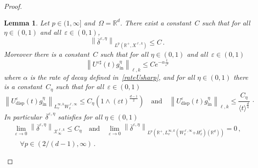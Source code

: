 \documentclass[11pt]{article}
\newtheorem{lemm}[theo]{Lemma}
\theoremstyle{definition}
\numberwithin{equation}{section}
\numberwithin{figure}{section}
\numberwithin{table}{section}
\newcommand*\R {\mathbb{R}}
\newcommand*\eps{{\varepsilon}}
\newcommand*\e{{\varepsilon}}
\DeclareMathOperator{\inn}{in}
\DeclareMathOperator{\disp}{disp}
\let\oldforall\forall
\renewcommand*{\forall}{\mathrel{\oldforall}}
\begin{document}
\begin{proof}
\begin{lemm}\label{resultstildegeps}
Let $p \in (1, \infty]$ and~$\Omega = \R^d$. There exist a constant~$C$ such that for all $\eta \in (0,1)$ and all~$\eps \in (0,1)$,
\begin{equation}\label{estimateLpXtildeg}
\left\|\overline\delta^{\eps,\eta} \right\|_{L^p(\R^+,{X}^{\ell,k})}
\leq C\,.
\end{equation}
Moreover there is a constant~$C$ such that for all $\eta \in (0,1)$ and all~$\eps \in (0,1)$
\begin{equation}\label{estimatedelta2}
\left\| U^{\eps \sharp}(t)g^\eta_{\inn}
\right\|_{\ell,k} \leq C e^{-\alpha \frac{t}{\eps^2}}
\end{equation}
where $\alpha$ is the rate of decay defined in~\eqref{rateUsharp}, and for all $\eta \in (0,1)$ there is a constant~$C_\eta$ such that for all~$\eps \in (0,1)$
\begin{equation}\label{estimatedelta1}
\left\|U^\eps_{\disp}(t) g^\eta_{\inn} \right\|_{L^{\infty,k}_v W^{\ell,\infty}_x} \leq C_\eta\left(1 \wedge \left(\eps t \right)^{\frac{d-1}{2}} \right)
\quad \text{and} \quad {\left\|U^\eps_{\disp}(t) g^\eta_{\inn} \right\|_{\ell,k} \le \frac{C_\eta}{\langle t \rangle^\frac d4}} \, \cdotp
\end{equation}
In particular~$\overline\delta^{\eps,\eta}$ satisfies for all $\eta \in (0,1)$
\begin{multline*}
\lim_{\e\to0} \left\|\overline\delta^{\eps,\eta}\right\|_{\mathcal{X}^{\ell,k}_\infty} \le C_\eta
\quad\text{and}\quad \lim_{\e\to0}\left\|\overline\delta^{\eps,\eta}\right\|_{L^p(\R^+,L^{\infty,k}_v(W^{\ell,\infty}_x{+ H^\ell_x})(\R^d))} = 0\,,\\ \quad \forall p \in ({2}/{(d-1)}, \infty) \,.
\end{multline*}
\end{lemm}



\end{proof}
\end{document}
